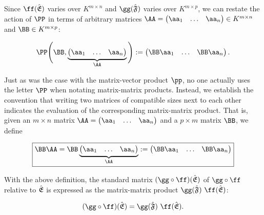 \begin{defn}
    Since $\ff(\sE)$ varies over $K^{m \times n}$ and $\gg(\sF)$ varies over $K^{m \times p}$, we can restate the action of $\PP$ in terms of arbitrary matrices $\AA = \begin{pmatrix} \aa_1 & \hdots & \aa_n \end{pmatrix} \in K^{m \times n}$ and $\BB \in K^{m \times p}$:
    
    \begin{align*}
        \PP \Bigg(\BB, \underbrace{\begin{pmatrix} \aa_1 & \hdots & \aa_n \end{pmatrix}}_\AA \Bigg) := 
        \begin{pmatrix} \BB \aa_1 & \hdots & \BB \aa_n \end{pmatrix}.
    \end{align*}
    
    Just as was the case with the matrix-vector product $\pp$, no one actually uses the letter $\PP$ when notating matrix-matrix products. Instead, we establish the convention that writing two matrices of compatible sizes next to each other indicates the evaluation of the corresponding matrix-matrix product. That is, given an $m \times n$ matrix $\AA = \begin{pmatrix} \aa_1 & \hdots & \aa_n \end{pmatrix}$ and a $p \times m$ matrix $\BB$, we define

    \begin{align*}
        \boxed
        {
            \BB \AA 
            =
            \BB
            \underbrace
            {\begin{pmatrix} 
                \aa_1 & \hdots & \aa_n
            \end{pmatrix}}_\AA
            := \begin{pmatrix} \BB \aa_1 & \hdots & \BB \aa_n \end{pmatrix}
        }
    \end{align*}
    
    With the above definition, the standard matrix $(\gg \circ \ff)(\sE)$ of $\gg \circ \ff$ relative to ${\hat{\mathfrak{E}}}$ is expressed as the matrix-matrix product $\gg(\sF) \spc \ff(\sE)$:
    
    \begin{align*}
        (\gg \circ \ff)(\sE) = \gg(\sF) \spc \ff(\sE).
    \end{align*}
\end{defn}

